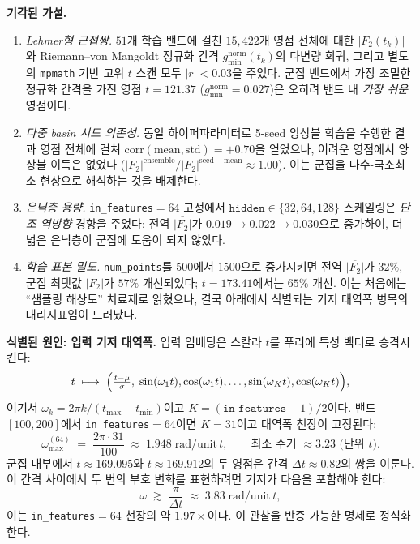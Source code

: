 \documentclass[11pt, a4paper]{article}
\theoremstyle{definition}
\theoremstyle{plain}
\begin{document}
\smallskip
\noindent\textbf{기각된 가설.}
\begin{enumerate}
  \item[(E1)] \emph{Lehmer형 근접쌍.} $51$개 학습 밴드에 걸친 $15{,}422$개 영점 전체에 대한 $|F_2(t_k)|$와 Riemann--von Mangoldt 정규화 간격 $g_{\min}^{\mathrm{norm}}(t_k)$의 다변량 회귀, 그리고 별도의 \texttt{mpmath} 기반 고위 $t$ 스캔 모두 $|r|<0.03$을 주었다. 군집 밴드에서 가장 조밀한 정규화 간격을 가진 영점 $t=121.37$ ($g_{\min}^{\mathrm{norm}}=0.027$)은 오히려 밴드 내 \emph{가장 쉬운} 영점이다.
  \item[(E2)] \emph{다중 basin 시드 의존성.} 동일 하이퍼파라미터로 5-seed 앙상블 학습을 수행한 결과 영점 전체에 걸쳐 $\mathrm{corr}(\mathrm{mean},\mathrm{std})=+0.70$을 얻었으나, 어려운 영점에서 앙상블 이득은 없었다 ($|F_2|^{\mathrm{ensemble}}/|F_2|^{\mathrm{seed-mean}}\approx 1.00$). 이는 군집을 다수-국소최소 현상으로 해석하는 것을 배제한다.
  \item[(E3)] \emph{은닉층 용량.} \texttt{in\_features}$=64$ 고정에서 $\texttt{hidden}\in\{32,64,128\}$ 스케일링은 \emph{단조 역방향} 경향을 주었다: 전역 $\overline{|F_2|}$가 $0.019\to 0.022\to 0.030$으로 증가하여, 더 넓은 은닉층이 군집에 도움이 되지 않았다.
  \item[(E4)] \emph{학습 표본 밀도.} \texttt{num\_points}를 $500$에서 $1500$으로 증가시키면 전역 $\overline{|F_2|}$가 $32\%$, 군집 최댓값 $|F_2|$가 $57\%$ 개선되었다; $t=173.41$에서는 $65\%$ 개선. 이는 처음에는 ``샘플링 해상도'' 치료제로 읽혔으나, 결국 아래에서 식별되는 기저 대역폭 병목의 대리지표임이 드러났다.
\end{enumerate}

\smallskip
\noindent\textbf{식별된 원인: 입력 기저 대역폭.} 입력 임베딩은 스칼라 $t$를 푸리에 특성 벡터로 승격시킨다:
\[
  t\;\longmapsto\;\Bigl(\tfrac{t-\mu}{\sigma},\;
  \sin(\omega_1 t),\cos(\omega_1 t),\dots,
  \sin(\omega_K t),\cos(\omega_K t)\Bigr),
\]
여기서 $\omega_k=2\pi k/(t_{\max}-t_{\min})$이고 $K=(\texttt{in\_features}-1)/2$이다. 밴드 $[100,200]$에서 \texttt{in\_features}$=64$이면 $K=31$이고 대역폭 천장이 고정된다:
\[
  \omega_{\max}^{(64)}
  \;=\; \frac{2\pi\cdot 31}{100}\;\approx\; 1.948\;
  \mathrm{rad}/\mathrm{unit}\,t,
  \qquad \text{최소 주기 }\approx 3.23\text{ (단위 }t\text{)}.
\]
군집 내부에서 $t\approx 169.095$와 $t\approx 169.912$의 두 영점은 간격 $\Delta t\approx 0.82$의 쌍을 이룬다. 이 간격 사이에서 두 번의 부호 변화를 표현하려면 기저가 다음을 포함해야 한다:
\begin{equation}
  \omega\;\gtrsim\; \frac{\pi}{\Delta t}\;\approx\; 3.83\;
  \mathrm{rad}/\mathrm{unit}\,t,
  \label{eq:required_omega}
\end{equation}
이는 \texttt{in\_features}$=64$ 천장의 약 $1.97\times$이다. 이 관찰을 반증 가능한 명제로 정식화한다.
\end{document}
